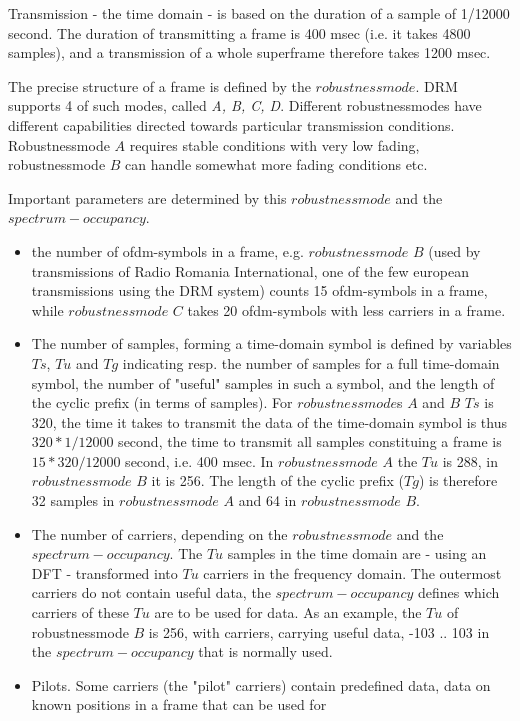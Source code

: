 \documentclass[11pt]{article}
\begin{document}
Transmission - the time domain - is based on the duration
of a sample of 1/12000 second. 
The duration of transmitting a frame is 400 msec (i.e. it takes 4800 samples),
and a transmission of a whole superframe therefore takes 1200 msec.

The precise structure of a frame is defined by the $robustnessmode$.
DRM supports 4  of such modes, called {\em A, B, C, D}. Different 
robustnessmodes
have different capabilities directed towards particular
transmission conditions.
Robustnessmode $A$ requires stable conditions with very low fading, 
robustnessmode $B$
can handle somewhat more fading conditions etc.

Important parameters are determined by this $robustnessmode$
and the $spectrum-occupancy$. 
\begin{itemize}
\item the number of ofdm-symbols in a frame, e.g.
$robustnessmode$ $B$ (used by transmissions of Radio Romania
International, one of the few
european transmissions using the DRM system) counts 15 ofdm-symbols
in a frame, while $robustnessmode$ $C$ takes 20
ofdm-symbols with less carriers in a frame.
\item The  number of samples, forming a time-domain symbol is
defined by variables $Ts$, $Tu$ and $Tg$ indicating resp.
the number of samples for a full time-domain symbol,
the number of "useful" samples in such a symbol, and the length of the
cyclic prefix (in terms of samples).
For $robustnessmode$s $A$ and $B$ $Ts$ is 320,
the time it takes to transmit
the data of the time-domain symbol is thus $320 * 1 / 12000$ second, the time
to transmit all samples constituing a
frame is $15 * 320 / 12000$ second, i.e. 400 msec.
In $robustnessmode$ $A$ the $Tu$ is 288, in $robustnessmode$ $B$  it is 256.
The length of the cyclic
prefix ($Tg$) is therefore 32 samples in $robustnessmode$ $A$ and 64 in 
$robustnessmode$ $B$. 
\item The number of carriers, depending on the $robustnessmode$ and the
$spectrum-occupancy$.
The $Tu$ samples in the time domain are - using an DFT - transformed into
$Tu$ carriers in the frequency domain.
The outermost carriers do not contain useful data,
the $spectrum-occupancy$ defines which carriers of
these $Tu$ are to be used for data.
As an example, the $Tu$ of robustnessmode $B$ is 256,
with carriers, carrying
useful data, -103 .. 103 in the $spectrum-occupancy$ that is normally used.
\item Pilots. Some carriers (the "pilot" carriers) contain predefined data,
data on known positions in a frame that can be used for

\end{itemize}
\end{document}
